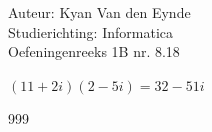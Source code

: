 \documentclass[a4paper]{article}
\begin{document}
  
\noindent \large Auteur: Kyan Van den Eynde \\
\noindent \large Studierichting: Informatica\\
\noindent \large Oefeningenreeks 1B nr. 8.18\\

\medskip

\normalsize

$(11+2i)(2-5i) = 32-51i$\\

\begin{thebibliography}{999}
\end{thebibliography}
\end{document}
